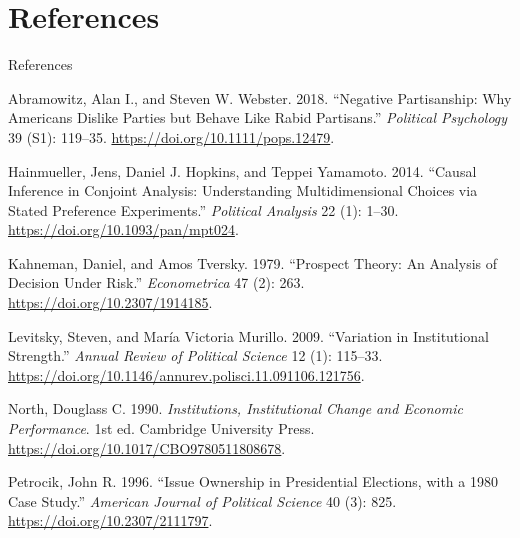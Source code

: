 \documentclass[
  ignorenonframetext,
]{beamer}
\newlength{\cslhangindent}
\newenvironment{CSLReferences}[2] %
 {\begin{list}{}{%
  \setlength{\itemindent}{0pt}
  \setlength{\leftmargin}{0pt}
  \setlength{\parsep}{0pt}
  \ifodd #1
   \setlength{\leftmargin}{\cslhangindent}
   \setlength{\itemindent}{-1\cslhangindent}
  \fi
  \setlength{\itemsep}{#2\baselineskip}}}
 {\end{list}}
\begin{document}
\section*{References}\label{references}

\begin{frame}[allowframebreaks]{References}
\label{refs}
\begin{CSLReferences}{1}{0}
Abramowitz, Alan I., and Steven W. Webster. 2018. {``Negative
Partisanship: Why Americans Dislike Parties but Behave Like Rabid
Partisans.''} \emph{Political Psychology} 39 (S1): 119--35.
\url{https://doi.org/10.1111/pops.12479}.

Hainmueller, Jens, Daniel J. Hopkins, and Teppei Yamamoto. 2014.
{``Causal {Inference} in {Conjoint Analysis}: {Understanding
Multidimensional Choices} via {Stated Preference Experiments}.''}
\emph{Political Analysis} 22 (1): 1--30.
\url{https://doi.org/10.1093/pan/mpt024}.

Kahneman, Daniel, and Amos Tversky. 1979. {``Prospect {Theory}: {An
Analysis} of {Decision} Under {Risk}.''} \emph{Econometrica} 47 (2):
263. \url{https://doi.org/10.2307/1914185}.

Levitsky, Steven, and María Victoria Murillo. 2009. {``Variation in
{Institutional Strength}.''} \emph{Annual Review of Political Science}
12 (1): 115--33.
\url{https://doi.org/10.1146/annurev.polisci.11.091106.121756}.

North, Douglass C. 1990. \emph{Institutions, {Institutional Change} and
{Economic Performance}}. 1st ed. Cambridge University Press.
\url{https://doi.org/10.1017/CBO9780511808678}.

Petrocik, John R. 1996. {``Issue {Ownership} in {Presidential
Elections}, with a 1980 {Case Study}.''} \emph{American Journal of
Political Science} 40 (3): 825. \url{https://doi.org/10.2307/2111797}.

\end{CSLReferences}
\end{frame}
\end{document}
